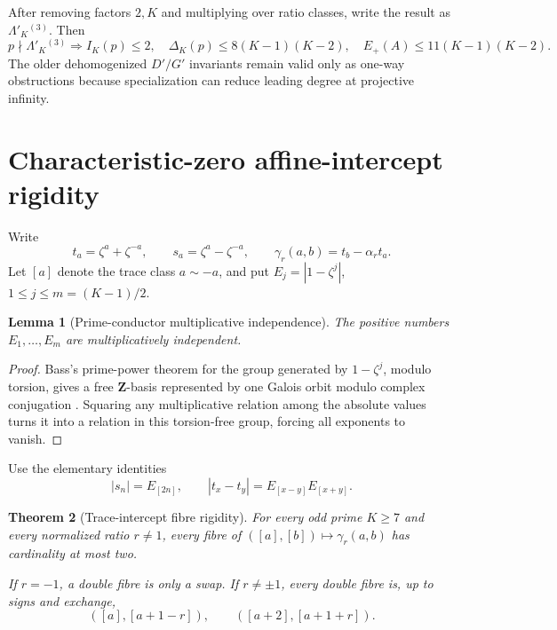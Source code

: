 \documentclass[11pt]{article}
\newtheorem{theorem}{Theorem}[section]
\newtheorem{lemma}[theorem]{Lemma}
\newcommand{\Z}{\mathbf Z}
\begin{document}
After removing factors $2,K$ and multiplying over ratio classes, write the
result as $\Lambda'_K{}^{(3)}$.  Then
\begin{equation}\label{eq:outside-support}
p\nmid\Lambda'_K{}^{(3)}
\Longrightarrow
I_K(p)\le2,
\quad
\Delta_K(p)\le8(K-1)(K-2),
\quad
E_+(A)\le11(K-1)(K-2).
\end{equation}
The older dehomogenized $D'/G'$ invariants remain valid only as one-way
obstructions because specialization can reduce leading degree at projective
infinity.

\section{Characteristic-zero affine-intercept rigidity}

Write
\[
t_a=\zeta^a+\zeta^{-a},\qquad
s_a=\zeta^a-\zeta^{-a},\qquad
\gamma_r(a,b)=t_b-\alpha_rt_a.
\]
Let $[a]$ denote the trace class $a\sim-a$, and put
$E_j=|1-\zeta^j|$, $1\le j\le m=(K-1)/2$.

\begin{lemma}[Prime-conductor multiplicative independence]\label{lem:bass}
The positive numbers $E_1,\ldots,E_m$ are multiplicatively independent.
\end{lemma}

\begin{proof}
Bass's prime-power theorem for the group generated by $1-\zeta^j$, modulo
torsion, gives a free $\Z$-basis represented by one Galois orbit modulo complex
conjugation \cite{Bass1966}.  Squaring any multiplicative relation among the
absolute values turns it into a relation in this torsion-free group, forcing all
exponents to vanish.
\end{proof}

Use the elementary identities
\begin{equation}\label{eq:absfacts}
|s_n|=E_{[2n]},\qquad
|t_x-t_y|=E_{[x-y]}E_{[x+y]}.
\end{equation}

\begin{theorem}[Trace-intercept fibre rigidity]\label{thm:intercept}
For every odd prime $K\ge7$ and every normalized ratio $r\ne1$, every fibre of
$([a],[b])\mapsto\gamma_r(a,b)$ has cardinality at most two.

If $r=-1$, a double fibre is only a swap.  If $r\ne\pm1$, every double fibre is,
up to signs and exchange,
\begin{equation}\label{eq:doublefibre}
([a],[a+1-r]),\qquad([a+2],[a+1+r]).
\end{equation}
\end{theorem}
\end{document}
